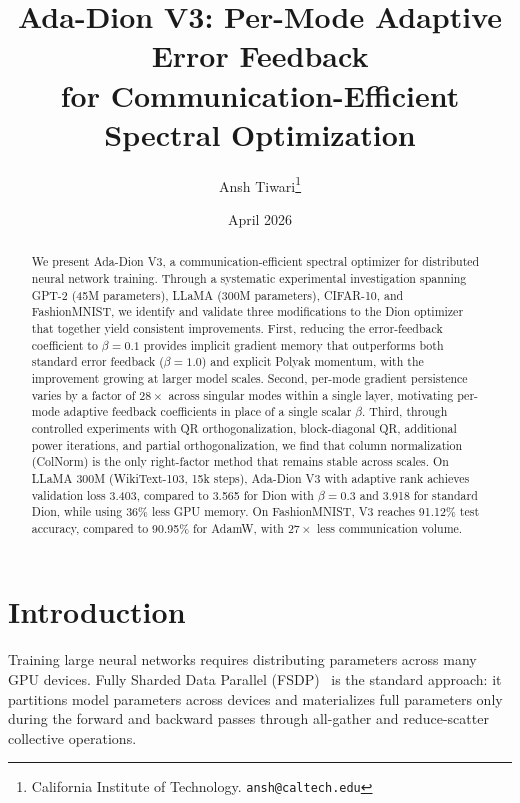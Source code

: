 \documentclass[11pt]{article}
\title{Ada-Dion V3: Per-Mode Adaptive Error Feedback\\for Communication-Efficient Spectral Optimization}
\author{
Ansh Tiwari\thanks{California Institute of Technology. \texttt{ansh@caltech.edu}}
}
\date{April 2026}
\begin{document}
\maketitle

\begin{abstract}
We present Ada-Dion V3, a communication-efficient spectral optimizer for distributed neural network training. Through a systematic experimental investigation spanning GPT-2 (45M parameters), LLaMA (300M parameters), CIFAR-10, and FashionMNIST, we identify and validate three modifications to the Dion optimizer that together yield consistent improvements. First, reducing the error-feedback coefficient to $\beta = 0.1$ provides implicit gradient memory that outperforms both standard error feedback ($\beta = 1.0$) and explicit Polyak momentum, with the improvement growing at larger model scales. Second, per-mode gradient persistence varies by a factor of $28\times$ across singular modes within a single layer, motivating per-mode adaptive feedback coefficients in place of a single scalar $\beta$. Third, through controlled experiments with QR orthogonalization, block-diagonal QR, additional power iterations, and partial orthogonalization, we find that column normalization (ColNorm) is the only right-factor method that remains stable across scales. On LLaMA 300M (WikiText-103, 15k steps), Ada-Dion V3 with adaptive rank achieves validation loss 3.403, compared to 3.565 for Dion with $\beta{=}0.3$ and 3.918 for standard Dion, while using 36\% less GPU memory. On FashionMNIST, V3 reaches 91.12\% test accuracy, compared to 90.95\% for AdamW, with $27\times$ less communication volume.
\end{abstract}


\section{Introduction}
\label{sec:intro}

Training large neural networks requires distributing parameters across many GPU devices. Fully Sharded Data Parallel (FSDP)~\cite{zhao2023pytorch} is the standard approach: it partitions model parameters across devices and materializes full parameters only during the forward and backward passes through all-gather and reduce-scatter collective operations.
\end{document}
